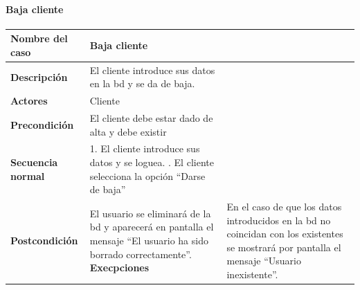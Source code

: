 \paragraph{Baja cliente}
\begin{table}[H]
    \centering
    \begin{tabularx}{0.7\textwidth}{|X|X|}
        \hline
        \textbf{Nombre del caso}  & \textbf{Baja cliente}                                                                                                                                \\
        \hline
        \textbf{Descripción}      & El cliente introduce sus datos en la \gls{bd} y se da de baja.                                                                                       \\
        \hline
        \textbf{Actores}          & Cliente                                                                                                                                              \\
        \hline
        \textbf{Precondición}     & El cliente debe estar dado de alta y debe existir                                                                                                    \\
        \hline
        \textbf{Secuencia normal} & 1. El cliente introduce sus datos y se loguea. . El cliente selecciona la opción ``Darse de baja''                                                                                                                             \\
        \hline
        \textbf{Postcondición}    & El usuario se eliminará de la \gls{bd} y aparecerá en pantalla el mensaje ``El usuario ha sido borrado correctamente''.
        \hline
        \textbf{Execpciones}      & En el caso de que los datos introducidos en la \gls{bd} no coincidan con los existentes se mostrará por pantalla el mensaje ``Usuario inexistente''. \\
        \hline
    \end{tabularx}
\end{table}
